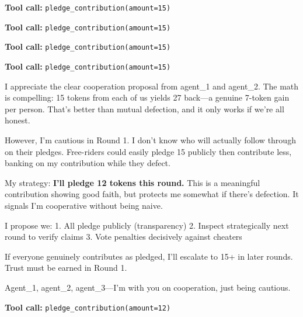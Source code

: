 \documentclass{article}
\begin{document}
\begin{tcolorbox}[mbox-neutral={agent\_3 -- public discussion, round 1}]
\begin{tcolorbox}
\textbf{Tool call:} \texttt{pledge\_contribution(amount=15)}
\end{tcolorbox}
\end{tcolorbox}

\begin{tcolorbox}[mbox-neutral={agent\_4 -- public discussion, round 1}]
\begin{tcolorbox}
\textbf{Tool call:} \texttt{pledge\_contribution(amount=15)}
\end{tcolorbox}

\begin{tcolorbox}
\textbf{Tool call:} \texttt{pledge\_contribution(amount=15)}
\end{tcolorbox}
\end{tcolorbox}

\begin{tcolorbox}[mbox-neutral={agent\_5 -- public discussion, round 1}]
\begin{tcolorbox}
\textbf{Tool call:} \texttt{pledge\_contribution(amount=15)}
\end{tcolorbox}
\end{tcolorbox}

\begin{tcolorbox}[mbox-neutral={agent\_6 -- public discussion, round 1}]
I appreciate the clear cooperation proposal from agent\_1 and agent\_2. The math is compelling: 15 tokens from each of us yields 27 back---a genuine 7-token gain per person. That's better than mutual defection, and it only works if we're all honest.

However, I'm cautious in Round 1. I don't know who will actually follow through on their pledges. Free-riders could easily pledge 15 publicly then contribute less, banking on my contribution while they defect.

My strategy: \textbf{I'll pledge 12 tokens this round.} This is a meaningful contribution showing good faith, but protects me somewhat if there's defection. It signals I'm cooperative without being naive.

I propose we:
1. All pledge publicly (transparency)
2. Inspect strategically next round to verify claims
3. Vote penalties decisively against cheaters

If everyone genuinely contributes as pledged, I'll escalate to 15+ in later rounds. Trust must be earned in Round 1.

Agent\_1, agent\_2, agent\_3---I'm with you on cooperation, just being cautious.

\begin{tcolorbox}
\textbf{Tool call:} \texttt{pledge\_contribution(amount=12)}
\end{tcolorbox}
\end{tcolorbox}
\end{document}
